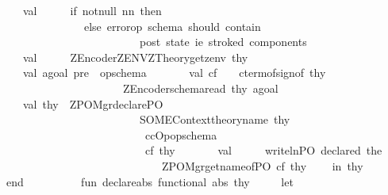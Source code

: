 \begin{isabellebody}
\ \ \ \ \ \ \ val\ {\isacharunderscore}\ \ \ \ {\isacharequal}\ if\ not{\isacharparenleft}null\ nn{\isacharparenright}\ then\ {\isacharparenleft}{\isacharparenright}\isanewline
\ \ \ \ \ \ \ \ \ \ \ \ \ \ \ \ \ \ else\ error{\isacharparenleft}{\isachardoublequote}op\ schema\ should\ contain\ \ {\isacharbackslash}\isanewline
\ \ \ \ \ \ \ \ \ \ \ \ \ \ \ \ \ \ \ \ \ \ \ \ \ \ \ \ {\isacharbackslash}post\ state\ {\isacharparenleft}i{\isachardot}e{\isachardot}\ {\isacharprime}stroked{\isacharprime}{\isacharparenright}\ components{\isachardot}\ {\isachardoublequote}{\isacharparenright}\isanewline
\ \ \ \ \ \ \ val\ {\isacharunderscore}\ \ \ \ {\isacharequal}\ {\isacharparenleft}ZEncoder{\isachardot}ZENV{\isacharcolon}{\isacharequal}ZTheory{\isachardot}get{\isacharunderscore}zenv\ thy{\isacharparenright}\isanewline
\isanewline
\ \ \ \ \ \ \ val\ agoal{\isacharequal}\ {\isachardoublequote}pre\ {\isachardoublequote}{\isacharcircum}\ opschema{\isacharsemicolon}\isanewline
\ \ \ \ \ \ \ val\ cf\ \ \ {\isacharequal}\ cterm{\isacharunderscore}of{\isacharparenleft}sign{\isacharunderscore}of\ thy{\isacharparenright}\isanewline
\ \ \ \ \ \ \ \ \ \ \ \ \ \ \ \ \ \ \ \ \ \ \ \ \ {\isacharparenleft}ZEncoder{\isachardot}schema{\isacharunderscore}read\ thy\ agoal{\isacharparenright}\isanewline
\ \ \ \ \ \ \ val\ thy{\isacharprime}\ {\isacharequal}\ ZPO{\isacharunderscore}Mgr{\isachardot}declare{\isacharunderscore}PO\ \isanewline
\ \ \ \ \ \ \ \ \ \ \ \ \ \ \ \ \ \ \ \ \ \ \ \ \ \ \ \ {\isacharparenleft}SOME{\isacharparenleft}Context{\isachardot}theory{\isacharunderscore}name\ thy{\isacharparenright}{\isacharcomma}\isanewline
\ \ \ \ \ \ \ \ \ \ \ \ \ \ \ \ \ \ \ \ \ \ \ \ \ \ \ \ \ {\isachardoublequote}ccOp{\isachardoublequote}{\isacharcomma}opschema{\isacharparenright}\ \isanewline
\ \ \ \ \ \ \ \ \ \ \ \ \ \ \ \ \ \ \ \ \ \ \ \ \ \ \ \ \ cf\ thy\isanewline
\ \ \ \ \ \ \ val\ {\isacharunderscore}\ \ \ \ {\isacharequal}\ writeln{\isacharparenleft}{\isachardoublequote}PO\ declared{\isacharcolon}\ {\isachardoublequote}{\isacharcircum}{\isacharparenleft}the\isanewline
\ \ \ \ \ \ \ \ \ \ \ \ \ \ \ \ \ \ \ \ \ \ \ \ \ \ \ \ \ \ \ \ {\isacharparenleft}ZPO{\isacharunderscore}Mgr{\isachardot}get{\isacharunderscore}name{\isacharunderscore}of{\isacharunderscore}PO\ cf\ thy{\isacharprime}{\isacharparenright}{\isacharparenright}{\isacharparenright}\isanewline
\isanewline
\ \ \ \ in\ thy{\isacharprime}\ \ \isanewline
\ \ \ \ end\ \ \ \ \ \isanewline
\isanewline
\ \isanewline
\ \ \ fun\ declare{\isacharunderscore}abs\ functional\ abs\ thy\ {\isacharequal}\ \isanewline
\ \ \ let\isanewline

\end{isabellebody}
